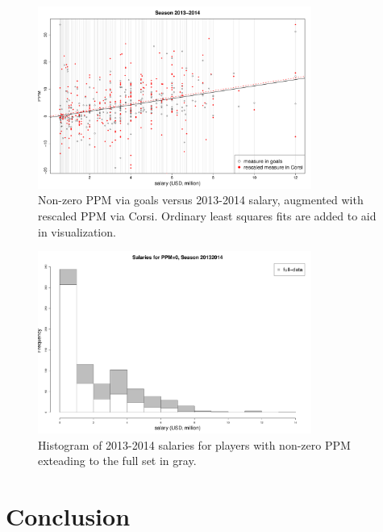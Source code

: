 \begin{figure}[htb!]
	\centering
	\includegraphics[width=0.8\textwidth]{figures/ppmsal-scat.pdf}
	\caption{Non-zero PPM via goals versus 2013-2014 salary, augmented with rescaled PPM via Corsi. Ordinary least squares fits are added to aid in visualization.}\label{fig:ppmsal-scat}
\end{figure}

\begin{figure}[htb!]
	\centering
	\includegraphics[width=0.8\textwidth]{figures/salaryhist.pdf}
	\caption{Histogram of 2013-2014 salaries for players with non-zero PPM exteading to the full set in gray.}\label{fig:salaryhist}
\end{figure}


\section{Conclusion}\label{sec:conclusion}

